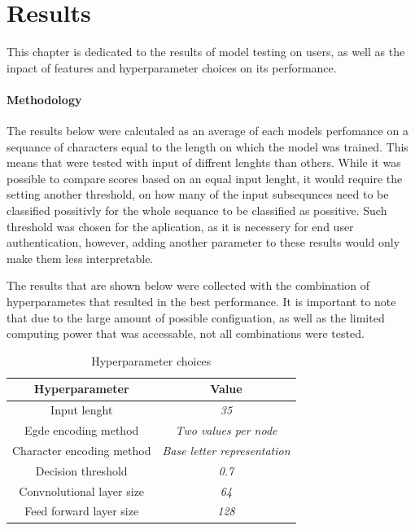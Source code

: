 
\chapter{Results}
This chapter is dedicated to the results of model testing on users, as well as the inpact of features and hyperparameter choices on its performance. 


\subsubsection{Methodology}
The results below were calcutaled as an average of each models perfomance on a sequance of characters equal to the length on which the model was trained.
This means that were tested with input of diffrent lenghts than others. 
While it was possible to compare scores based on an equal input lenght,
it would require the setting another threshold, on how many of the input subsequnces need to be classified possitivly for the whole sequance to be classified as possitive. 
Such threshold was chosen for the aplication, as it is necessery for end user authentication, however, adding another parameter to these results would only make them less interpretable.

The results that are shown below were collected with the combination of hyperparametes that resulted in the best performance. It is important to note that due to the large amount of possible
configuation, as well as the limited computing power that was accessable, not all combinations were tested.

\begin{center}
	\begin{table}[H]
		
\begin{center}
	\begin{tabular}{ |c|c|} 
		\hline
		Hyperparameter & Value \\
		\hline
		Input lenght & \textit{35} \\ 
		\hline
		Egde encoding method & \textit{Two values per node} \\		
		\hline 
		Character encoding method & \textit{Base letter representation} \\		 
		\hline
		Decision threshold & \textit{0.7} \\
		\hline
		Convnolutional layer size & \textit{64} \\
		\hline
		Feed forward layer size & \textit{128} \\
		\hline
	\end{tabular}
\end{center}
	\caption{Hyperparameter choices}
	\label{table:hyperparams}
	\end{table}
\end{center}

